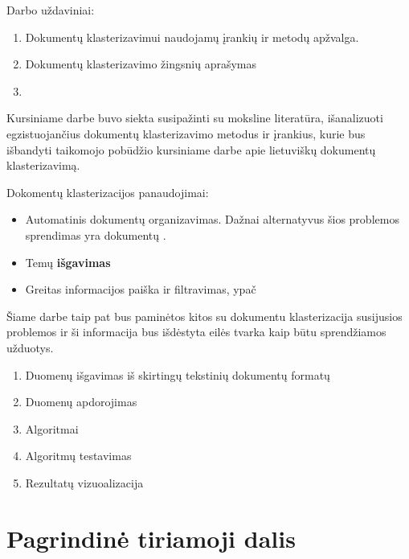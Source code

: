 \documentclass[draft]{VUMIFInfKursinis}
\begin{document}
Darbo uždaviniai: 
\begin{enumerate}
	\item Dokumentų klasterizavimui naudojamų įrankių ir metodų apžvalga.
	\item Dokumentų klasterizavimo žingsnių aprašymas
	\item 
\end{enumerate}

Kursiniame darbe buvo siekta susipažinti su moksline literatūra, išanalizuoti egzistuojančius dokumentų klasterizavimo metodus ir įrankius, kurie bus išbandyti taikomojo pobūdžio  kursiniame darbe apie lietuviškų dokumentų klasterizavimą.

Dokomentų klasterizacijos panaudojimai:
\begin{itemize}
	\item Automatinis dokumentų organizavimas. Dažnai alternatyvus šios problemos sprendimas yra dokumentų .
	\item Temų \textbf{išgavimas}
	\item Greitas informacijos paiška ir filtravimas, ypač
\end{itemize}
Šiame darbe taip pat bus paminėtos kitos su dokumentu klasterizacija susijusios problemos ir ši informacija bus išdėstyta eilės tvarka kaip būtu sprendžiamos užduotys.
\begin{enumerate}
	\item Duomenų išgavimas iš skirtingų tekstinių dokumentų formatų
	\item Duomenų apdorojimas
	\item Algoritmai
	\item Algoritmų testavimas
	\item Rezultatų vizuoalizacija
\end{enumerate}



\section{Pagrindinė tiriamoji dalis}
\end{document}
